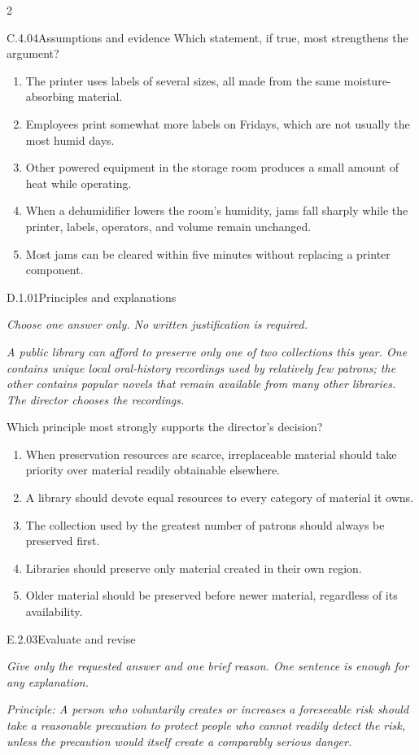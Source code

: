 \documentclass[9pt]{extarticle}
\newcommand{\choice}[1]{\item #1}
\begin{document}
\begin{multicols}{2}
\begin{DenseCoreProblem}{C.4.04}{Assumptions and evidence}
Which statement, if true, most strengthens the argument?
\begin{enumerate}[label=(\alph*)]
  \choice{The printer uses labels of several sizes, all made from the same moisture-absorbing material.}
  \choice{Employees print somewhat more labels on Fridays, which are not usually the most humid days.}
  \choice{Other powered equipment in the storage room produces a small amount of heat while operating.}
  \choice{When a dehumidifier lowers the room's humidity, jams fall sharply while the printer, labels, operators, and volume remain unchanged.}
  \choice{Most jams can be cleared within five minutes without replacing a printer component.}
\end{enumerate}
\end{DenseCoreProblem}
\begin{DenseCoreProblem}{D.1.01}{Principles and explanations}
{\scriptsize\textit{Choose one answer only. No written justification is required.}\par}
\emph{A public library can afford to preserve only one of two collections this year. One contains unique local oral-history recordings used by relatively few patrons; the other contains popular novels that remain available from many other libraries. The director chooses the recordings.}

Which principle most strongly supports the director's decision?
\begin{enumerate}[label=(\alph*)]
  \choice{When preservation resources are scarce, irreplaceable material should take priority over material readily obtainable elsewhere.}
  \choice{A library should devote equal resources to every category of material it owns.}
  \choice{The collection used by the greatest number of patrons should always be preserved first.}
  \choice{Libraries should preserve only material created in their own region.}
  \choice{Older material should be preserved before newer material, regardless of its availability.}
\end{enumerate}
\end{DenseCoreProblem}
\begin{DenseCoreProblem}{E.2.03}{Evaluate and revise}
{\scriptsize\textit{Give only the requested answer and one brief reason. One sentence is enough for any explanation.}\par}
\emph{Principle: A person who voluntarily creates or increases a foreseeable risk should take a reasonable precaution to protect people who cannot readily detect the risk, unless the precaution would itself create a comparably serious danger.}


\end{DenseCoreProblem}
\end{multicols}
\end{document}
